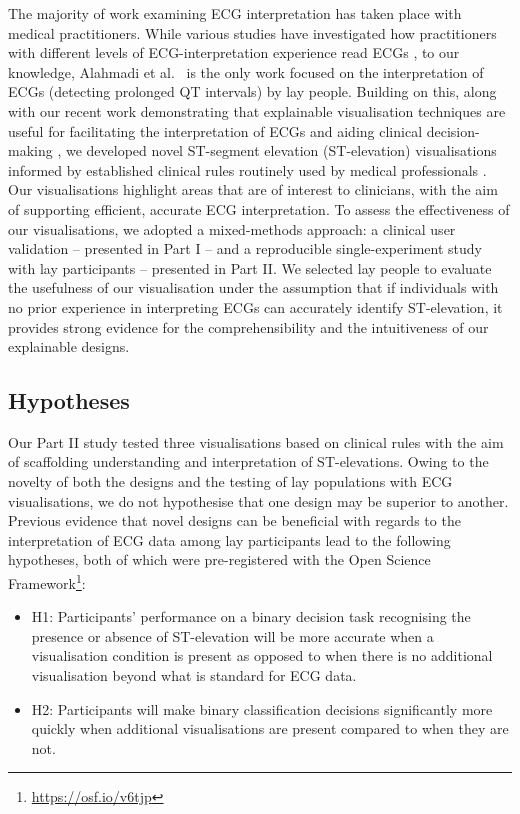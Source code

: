 \documentclass[
  10pt,
  letterpaper,
]{article}
\begin{document}
The majority of work examining ECG interpretation has taken place with
medical practitioners. While various studies have investigated how
practitioners with different levels of ECG-interpretation experience
read ECGs \citep{cook_2020, davies_2019, attar_2025}, to our knowledge,
Alahmadi et al.~\citep{alahmadi_2019a, alahmadi_2019b, alahmadi_2020} is
the only work focused on the interpretation of ECGs (detecting prolonged
QT intervals) by lay people. Building on this, along with our recent
work demonstrating that explainable visualisation techniques are useful
for facilitating the interpretation of ECGs and aiding clinical
decision-making \citep{hughes_2025, noehrer}, we developed novel
ST-segment elevation (ST-elevation) visualisations informed by
established clinical rules routinely used by medical professionals
\cite{rao_2025}. Our visualisations highlight areas that are of interest
to clinicians, with the aim of supporting efficient, accurate ECG
interpretation. To assess the effectiveness of our visualisations, we
adopted a mixed-methods approach: a clinical user validation --
presented in Part I -- and a reproducible single-experiment study with
lay participants -- presented in Part II. We selected lay people to
evaluate the usefulness of our visualisation under the assumption that
if individuals with no prior experience in interpreting ECGs can
accurately identify ST-elevation, it provides strong evidence for the
comprehensibility and the intuitiveness of our explainable designs.

\subsection{Hypotheses}\label{sec-hypotheses}

Our Part II study tested three visualisations based on clinical rules
with the aim of scaffolding understanding and interpretation of
ST-elevations. Owing to the novelty of both the designs and the testing
of lay populations with ECG visualisations, we do not hypothesise that
one design may be superior to another. Previous evidence that novel
designs can be beneficial with regards to the interpretation of ECG data
among lay participants
\citep{alahmadi_2019a, alahmadi_2019b, alahmadi_2020, alahmadi_2021, alahmadi_2023}
lead to the following hypotheses, both of which were pre-registered with
the Open Science Framework\footnote{\url{https://osf.io/v6tjp}}:

\begin{itemize}
\item
  H1: Participants' performance on a binary decision task recognising the presence or absence of ST-elevation will be more accurate when a visualisation condition is present as opposed to when there is no additional visualisation beyond what is standard for ECG data.
\item
  H2: Participants will make binary classification decisions significantly more quickly when additional visualisations are present compared to when they are not.
\end{itemize}
\end{document}

